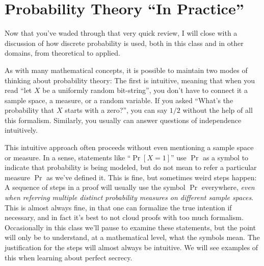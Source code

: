 \documentclass[11pt]{article}
\begin{document}
\section{Probability Theory ``In Practice''}

Now that you've waded through that very quick review, I will close with
a discussion of how discrete probability is used, both in this class and
in other domains, from theoretical to applied.

As with many mathematical concepts, it is possible to maintain two modes of
thinking about probability theory: The first is intuitive, meaning that when
you read ``let $X$ be a uniformly random bit-string'', you don't have to
connect it a sample space, a measure, or a random variable. If you asked
``What's the probability that $X$ starts with a zero?'', you can say $1/2$
without the help of all this formalism. Similarly, you usually can answer
questions of independence intuitively.

This intuitive approach often proceeds without even mentioning a sample space
or measure. In a sense, statements like ``$\Pr[X=1]$'' use $\Pr$ as a symbol to
indicate that probability is being modeled, but do not mean to refer a
particular measure $\Pr$ as we've defined it. This is fine, but sometimes weird
steps happen: A sequence of steps in a proof will usually use the symbol $\Pr$
everywhere, \emph{even when referring multiple distinct probability measures on
different sample spaces}.  This is almost always fine, in that one can
formalize the true intention if necessary, and in fact it's best to not cloud
proofs with too much formalism.  Occasionally in this class we'll pause to
examine these statements, but the point will only be to understand, at a
mathematical level, what the symbols mean. The justification for the steps will
almost always be intuitive. We will see examples of this when learning
about perfect secrecy.
\end{document}
